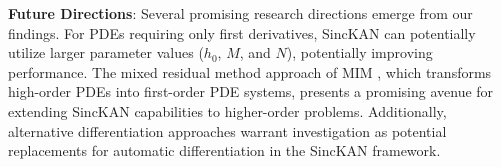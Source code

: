 \textbf{Future Directions}: Several promising research directions emerge from our findings. For PDEs requiring only first derivatives, SincKAN can potentially utilize larger parameter values ($h_0$, $M$, and $N$), potentially improving performance. The mixed residual method approach of MIM \citep{lyu2022mim,li2024priori}, which transforms high-order PDEs into first-order PDE systems, presents a promising avenue for extending SincKAN capabilities to higher-order problems. Additionally, alternative differentiation approaches \citep{cen2024deep,yu2024fourier}
 warrant investigation as potential replacements for automatic differentiation in the SincKAN framework.


